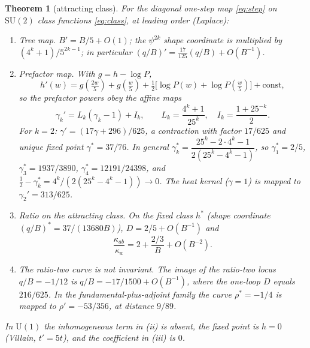 \documentclass[11pt,a4paper]{article}
\newtheorem{theorem}{Theorem}
\theoremstyle{definition}
\theoremstyle{remark}
\newcommand{\SU}{\mathrm{SU}(2)}
\begin{document}
\begin{theorem}[attracting class]\label{thm:class}
For the diagonal one-step map \eqref{eq:step} on $\SU$ class functions \eqref{eq:class}, at leading order (Laplace):
\begin{enumerate}[label=(\roman*)]
\item \emph{Tree map.} $B'=B/5+O(1)$; the $\psi^{2k}$ shape coordinate is multiplied by $(4^k+1)/5^{2k-1}$; in particular $(q/B)'=\tfrac{17}{125}(q/B)+O(B^{-1})$.
\item \emph{Prefactor map.} With $g=h-\log P$,
\[
h'(w)=g(\tfrac{2w}5)+g(\tfrac w5)+\tfrac12\bigl[\log P(w)+\log P(\tfrac w5)\bigr]+\mathrm{const},
\]
so the prefactor powers obey the affine maps
\[
\gamma_k'=L_k(\gamma_k-1)+I_k,\qquad L_k=\frac{4^k+1}{25^k},\quad I_k=\frac{1+25^{-k}}2 .
\]
For $k=2$: $\gamma'=(17\gamma+296)/625$, a contraction with factor $17/625$ and unique fixed point $\gamma^*=37/76$. In general $\gamma_k^*=\dfrac{25^k-2\cdot4^k-1}{2(25^k-4^k-1)}$, so $\gamma^*_1=2/5$, $\gamma^*_3=1937/3890$, $\gamma^*_4=12191/24398$, and $\tfrac12-\gamma_k^*=4^k/(2(25^k-4^k-1))\to0$. The heat kernel ($\gamma=1$) is mapped to $\gamma_2'=313/625$.
\item \emph{Ratio on the attracting class.} On the fixed class $h^*$ (shape coordinate $(q/B)^*=37/(13680B)$), $D=2/5+O(B^{-1})$ and
\[
\frac{\kappa_{ab}}{\kappa_a}=2+\frac{2/3}{B}+O(B^{-2}).
\]
\item \emph{The ratio-two curve is not invariant.} The image of the ratio-two locus $q/B=-1/12$ is $q/B=-17/1500+O(B^{-1})$, where the one-loop $D$ equals $216/625$. In the fundamental-plus-adjoint family the curve $\rho^*=-1/4$ is mapped to $\rho'=-53/356$, at distance $9/89$.
\end{enumerate}
In $\mathrm{U}(1)$ the inhomogeneous term in (ii) is absent, the fixed point is $h=0$ (Villain, $t'=5t$), and the coefficient in (iii) is $0$.
\end{theorem}
\end{document}
